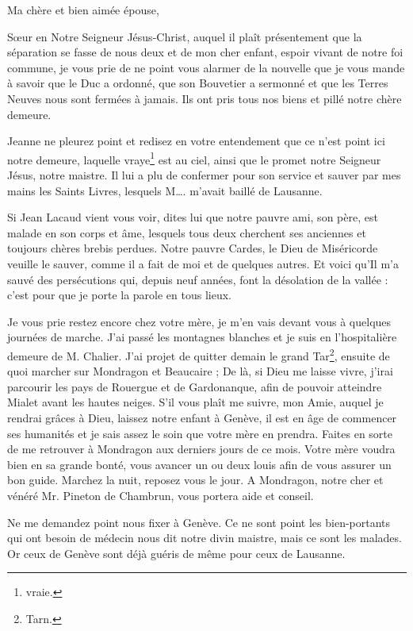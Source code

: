{
\Junicode

\vspace{-5mm}

Ma chère et bien aimée épouse,

Sœur en Notre Seigneur Jésus-Christ, auquel il plaît présentement que la séparation se fasse de nous deux et de mon cher enfant, espoir vivant de notre foi commune, je vous prie de ne point vous alarmer de la nouvelle que je vous mande à savoir que le Duc a ordonné, que son Bouvetier a sermonné et que les Terres Neuves nous sont fermées à jamais. Ils ont pris tous nos biens et pillé notre chère demeure.

Jeanne ne pleurez point et redisez en votre entendement que ce n’est point ici notre demeure, laquelle vraye\footnote{vraie.} est au ciel, ainsi que le promet notre Seigneur Jésus, notre maistre. Il lui a plu de confermer pour son service et sauver par mes mains les Saints Livres, lesquels M…. m’avait baillé de Lausanne.

Si Jean Lacaud vient vous voir, dites lui que notre pauvre ami, son père, est malade en son corps et âme, lesquels tous deux cherchent ses anciennes et toujours chères brebis perdues. Notre pauvre Cardes, le Dieu de Miséricorde veuille le sauver, comme il a fait de moi et de quelques autres. Et voici qu’Il m’a sauvé des persécutions qui, depuis neuf années, font la désolation de la vallée : c’est pour que je porte la parole en tous lieux.

Je vous prie restez encore chez votre mère, je m’en vais devant vous à quelques journées de marche. J’ai passé les montagnes blanches et je suis en l’hospitalière demeure de M. Chalier. J’ai projet de quitter demain le grand Tar\footnote{Tarn.}, ensuite de quoi marcher sur Mondragon et Beaucaire ; De là, si Dieu me laisse vivre, j’irai parcourir les pays de Rouergue et de Gardonanque, afin de pouvoir atteindre Mialet avant les hautes neiges. S’il vous plaît me suivre, mon Amie, auquel je rendrai grâces à Dieu, laissez notre enfant à Genève, il est en âge de commencer ses humanités et je sais assez le soin que votre mère en prendra. Faites en sorte de me retrouver à Mondragon aux derniers jours de ce mois. Votre mère voudra bien en sa grande bonté, vous avancer un ou deux louis afin de vous assurer un bon guide. Marchez la nuit, reposez vous le jour. A Mondragon, notre cher et vénéré Mr. Pineton de Chambrun, vous portera aide et conseil.

Ne me demandez point nous fixer à Genève. Ce ne sont point les bien-portants qui ont besoin de médecin nous dit notre divin maistre, mais ce sont les malades. Or ceux de Genève sont déjà guéris de même pour ceux de Lausanne.

}

